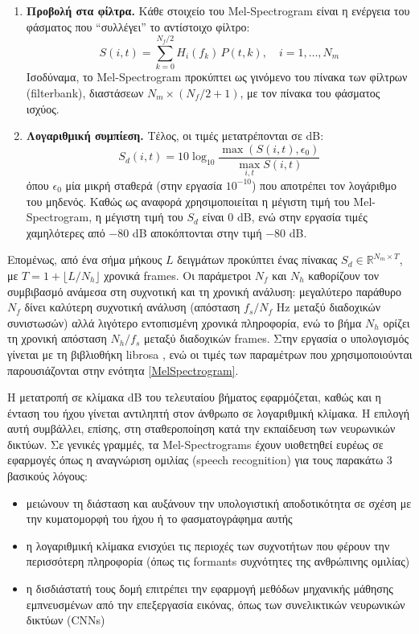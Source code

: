 \begin{enumerate}
\item \textbf{Προβολή στα φίλτρα.} Κάθε στοιχείο του Mel-Spectrogram είναι η ενέργεια του φάσματος που ``συλλέγει'' το αντίστοιχο φίλτρο:
\[
S(i,t) = \sum_{k=0}^{N_f/2} H_i(f_k) \, P(t,k), \quad i = 1, \ldots, N_m
\]
Ισοδύναμα, το Mel-Spectrogram προκύπτει ως γινόμενο του πίνακα των φίλτρων (filterbank), διαστάσεων $N_m \times (N_f/2 + 1)$, με τον πίνακα του φάσματος ισχύος.

\item \textbf{Λογαριθμική συμπίεση.} Τέλος, οι τιμές μετατρέπονται σε dB:
\[
S_d(i,t) = 10 \log_{10} \frac{\max\left(S(i,t), \epsilon_0\right)}{\max_{i,t} S(i,t)}
\]
όπου $\epsilon_0$ μία μικρή σταθερά (στην εργασία $10^{-10}$) που αποτρέπει τον λογάριθμο του μηδενός. Καθώς ως αναφορά χρησιμοποιείται η μέγιστη τιμή του Mel-Spectrogram, η μέγιστη τιμή του $S_d$ είναι 0 dB, ενώ στην εργασία τιμές χαμηλότερες από $-80$ dB αποκόπτονται στην τιμή $-80$ dB.
\end{enumerate}

Επομένως, από ένα σήμα μήκους $L$ δειγμάτων προκύπτει ένας πίνακας $S_d \in \mathbb{R}^{N_m \times T}$, με $T = 1 + \lfloor L / N_h \rfloor$ χρονικά frames. Οι παράμετροι $N_f$ και $N_h$ καθορίζουν τον συμβιβασμό ανάμεσα στη συχνοτική και τη χρονική ανάλυση: μεγαλύτερο παράθυρο $N_f$ δίνει καλύτερη συχνοτική ανάλυση (απόσταση $f_s/N_f$ Hz μεταξύ διαδοχικών συνιστωσών) αλλά λιγότερο εντοπισμένη χρονικά πληροφορία, ενώ το βήμα $N_h$ ορίζει τη χρονική απόσταση $N_h/f_s$ μεταξύ διαδοχικών frames. Στην εργασία ο υπολογισμός γίνεται με τη βιβλιοθήκη librosa \cite{McFee2015librosa}, ενώ οι τιμές των παραμέτρων που χρησιμοποιούνται παρουσιάζονται στην ενότητα \ref{MelSpectrogram}.

Η μετατροπή σε κλίμακα dB του τελευταίου βήματος εφαρμόζεται, καθώς και η ένταση του ήχου γίνεται αντιληπτή στον άνθρωπο σε λογαριθμική κλίμακα. Η επιλογή αυτή συμβάλλει, επίσης, στη σταθεροποίηση κατά την εκπαίδευση των νευρωνικών δικτύων. Σε γενικές γραμμές, τα Mel-Spectrograms έχουν υιοθετηθεί ευρέως σε εφαρμογές όπως η αναγνώριση ομιλίας (speech recognition) για τους παρακάτω 3 βασικούς λόγους:

\begin{itemize}
\item μειώνουν τη διάσταση και αυξάνουν την υπολογιστική αποδοτικότητα σε σχέση με την κυματομορφή του ήχου ή το φασματογράφημα αυτής

\item η λογαριθμική κλίμακα ενισχύει τις περιοχές των συχνοτήτων που φέρουν την περισσότερη πληροφορία (όπως τις formants συχνότητες της ανθρώπινης ομιλίας)

\item η δισδιάστατή τους δομή επιτρέπει την εφαρμογή μεθόδων μηχανικής μάθησης εμπνευσμένων από την επεξεργασία εικόνας, όπως των συνελικτικών νευρωνικών δικτύων (CNNs)
\end{itemize}

